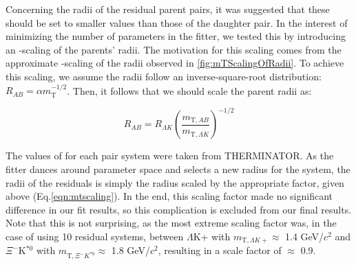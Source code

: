 \documentclass[/home/jesse/Analysis/FemtoAnalysis/AnalysisNotes/AnalysisNoteJBuxton.tex]{subfiles}
\begin{document}
Concerning the radii of the residual parent pairs, it was suggested that these should be set to smaller values than those of the daughter pair.  In the interest of minimizing the number of parameters in the fitter, we tested this by introducing an \mt-scaling of the parents' radii.  The motivation for this scaling comes from the approximate \mt-scaling of the radii observed in \ref{fig:mTScalingOfRadii}.  To achieve this scaling, we assume the radii follow an inverse-square-root distribution: $R_{AB} = \alpha m_{\mathrm{T}}^{-1/2}$.  Then, it follows that we should scale the parent radii as:

\begin{equation}
R_{AB} = R_{\Lambda K}\left(\frac{m_{\mathrm{T},AB}}{m_{\mathrm{T},\Lambda K}}\right)^{-1/2}
\label{eqn:mtscaling}
\end{equation}

The values of \mt for each pair system were taken from THERMINATOR.  As the fitter dances around parameter space and selects a new radius for the \LamK system, the radii of the residuals is simply the \LamK radius scaled by the appropriate factor, given above (Eq.\ref{eqn:mtscaling}).  In the end, this scaling factor made no significant difference in our fit results, so this complication is excluded from our final results.  Note that this is not surprising, as the most extreme scaling factor was, in the case of using 10 residual systems, between $\Lambda$K+ with $m_{\mathrm{T},\Lambda K+} \approx$ 1.4 GeV/$c^{2}$ and $\Xi^{-}$K$^{*0}$ with $m_{\mathrm{T},\Xi^{-} K^{*0}} \approx$ 1.8 GeV/$c^{2}$, resulting in a scale factor of $\approx$ 0.9.
\end{document}
